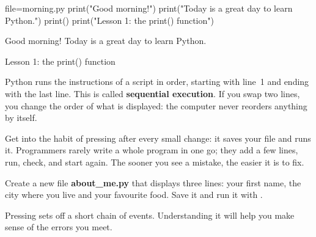 \begin{code}{file=morning.py}
print("Good morning!")
print("Today is a great day to learn Python.")
print()
print("Lesson 1: the print() function")
\end{code}
\begin{sortie}
Good morning!
Today is a great day to learn Python.

Lesson 1: the print() function
\end{sortie}

Python runs the instructions of a script in order, starting with line~1 and ending with the last
line. This is called \textbf{sequential execution}. If you swap two lines, you change the order of
what is displayed: the computer never reorders anything by itself.

\begin{astuce}
Get into the habit of pressing  after every small change: it saves your file and runs
it. Programmers rarely write a whole program in one go; they add a few lines, run, check, and start
again. The sooner you see a mistake, the easier it is to fix.
\end{astuce}

\begin{atoi}[About me]
Create a new file \textbf{about\_me.py} that displays three lines: your first name, the city where
you live and your favourite food. Save it and run it with .
\end{atoi}


Pressing  sets off a short chain of events. Understanding it will help you make sense of
the errors you meet.

\begin{center}
\end{center}

